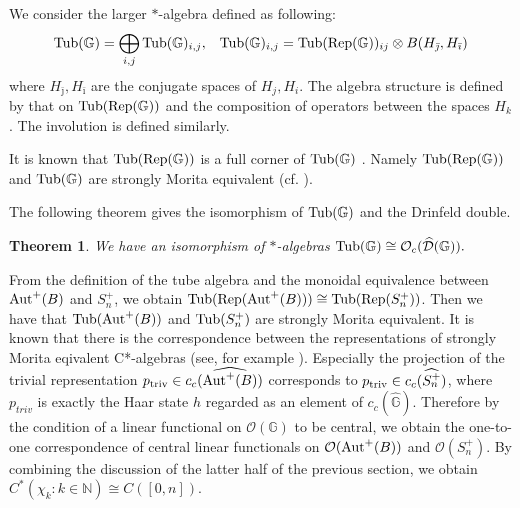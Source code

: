\documentclass[12pt]{amsart}
\theoremstyle{plain} %
\newtheorem{theorem}[equation]{Theorem}
\theoremstyle{definition}
\theoremstyle{remark}
\begin{document}
 We consider the larger $*$-algebra defined as following:
 \[{\rm Tub}(\mathbb{G})=\bigoplus_{i,j}{\rm Tub}(\mathbb{G})_{i, j},\;\;\;{\rm Tub}(\mathbb{G})_{i, j}={\rm Tub}({\rm Rep}(\mathbb{G}))_{ij}\otimes B(H_{\bar{\jmath}}, H_{\bar{\imath}})\]
 where $H_{\bar{\jmath}}, H_{\bar{\imath}}$ are the conjugate spaces of $H_j, H_i$.
 The algebra structure is defined by that on ${\rm Tub}({\rm Rep}(\mathbb{G}))$ and the composition of operators between the spaces $H_k$. The involution is defined similarly.

 It is known that ${\rm Tub}({\rm Rep}(\mathbb{G}))$ is a full corner of ${\rm Tub}(\mathbb{G})$ \cite[Lemma 3.4]{NY18}. Namely ${\rm Tub}({\rm Rep}(\mathbb{G}))$ and ${\rm Tub}(\mathbb{G})$ are strongly Morita equivalent (cf. \cite[Example 3.6]{RW98}).
 
 The following theorem \cite[Theorem 3.5]{NY18} gives the isomorphism of ${\rm Tub}(\mathbb{G})$ and the Drinfeld double.
 
  \begin{theorem}
 We have an isomorphism of $*$-algebras ${\rm Tub}(\mathbb{G})\cong \mathcal{O}_c(\widehat{\mathcal{D}}(\mathbb{G})).$
 \end{theorem}

From the definition of the tube algebra and the monoidal equivalence between ${\rm Aut}^+(B)$ and $S_n^+$, we obtain ${\rm Tub}({\rm Rep}({\rm Aut}^+(B)))\cong {\rm Tub}({\rm Rep}(S_n^+))$. 
 Then we have that ${\rm Tub}({\rm Aut}^+(B))$ and ${\rm Tub}(S_n^+)$ are strongly Morita equivalent. It is known that there is the correspondence between the representations of strongly Morita eqivalent C*-algebras (see, for example \cite[Section 3.3]{RW98}). 
 Especially the projection of the trivial representation $p_{{\rm triv}}\in c_c(\widehat{{\rm Aut}^+(B)})$ corresponds to $p_{{\rm triv}}\in c_c(\widehat{S_n^+})$, where $p_{triv}$ is exactly the Haar state $h$ regarded as an element of $c_c(\widehat{\mathbb{G}})$. 
 Therefore by the condition of a linear functional on $\mathcal{O}(\mathbb{G})$ to be central, we obtain the one-to-one correspondence of central linear functionals on $\mathcal{O}({\rm Aut}^+(B))$ and $\mathcal{O}(S_n^+)$.
 By combining the discussion of the latter half of the previous section, we obtain $C^*(\chi_k : k\in \mathbb{N})\cong C([0,n])$. 
 




\end{document}

